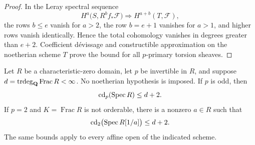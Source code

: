 \begin{proof}
In the Leray spectral sequence
\[
 H^a\bigl(S,R^b f_*\mathcal F\bigr)
 \Longrightarrow H^{a+b}(T,\mathcal F),
\]
the rows $b\leq e$ vanish for $a>2$, the row $b=e+1$ vanishes
for $a>1$, and higher rows vanish identically. Hence the total
cohomology vanishes in degrees greater than $e+2$.
Coefficient d\'evissage and constructible approximation on the
noetherian scheme $T$ prove the bound for all $p$-primary torsion
sheaves.
\end{proof}

\begin{proposition}
\label{A:arithmetic-transcendence}
Let $R$ be a characteristic-zero domain, let $p$ be invertible
in $R$, and suppose
$d=\operatorname{trdeg}_{\mathbf Q}\operatorname{Frac}R<\infty$.
No noetherian hypothesis is imposed. If $p$ is odd, then
\[
 \operatorname{cd}_p(\operatorname{Spec} R)\leq d+2.
\]
If $p=2$ and $K=\operatorname{Frac}R$ is not orderable, there
is a nonzero $a\in R$ such that
\[
 \operatorname{cd}_2\bigl(\operatorname{Spec} R[1/a]\bigr)\leq d+2.
\]
The same bounds apply to every affine open of the indicated scheme.
\end{proposition}
